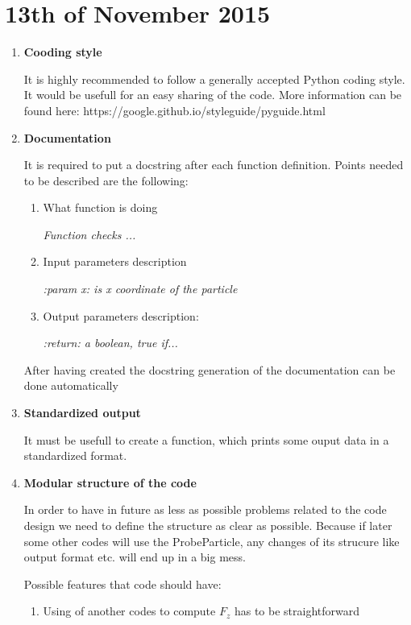\section{13th of November 2015}

\begin{enumerate}
    \item \textbf{Cooding style}

    It is highly recommended to follow a generally accepted Python coding style.
    It would be usefull for an easy sharing of the code. More information can be found
    here: https://google.github.io/styleguide/pyguide.html

    \item \textbf{Documentation}

    It is required to put a docstring after each function definition. Points
    needed to be described are the following:
    \begin{enumerate}
        \item What function is doing

        \textit{Function checks ...}

        \item Input parameters description

        \textit{:param x: is x coordinate of the particle}

        \item Output parameters description:

        \textit{ :return: a boolean, true if...}
    \end{enumerate}

    After having created the docstring generation of the documentation can be done automatically

    \item \textbf{Standardized output}

    It must be usefull to create a function, which prints some ouput data in a
    standardized format. 

    \item \textbf{Modular structure of the code}

    In order to have in future as less as possible problems related to the code
    design we need to define the structure as clear as possible. Because if later some other
    codes will use the  ProbeParticle, any changes of its strucure like
    output format etc. will end up in a big mess. 
    
    Possible features that code should have:
        \begin{enumerate}
            \item Using of another codes to compute $F_z$ has to be
            straightforward


\end{enumerate}
\end{enumerate}
